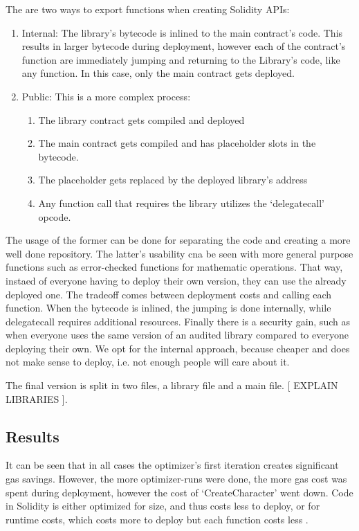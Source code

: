 The are two ways to export functions when creating Solidity APIs:
\begin{enumerate}
    \item Internal: The library's bytecode is inlined to the main contract's code. This results in larger bytecode during deployment, however each of the contract's function are immediately jumping and returning to the Library's code, like any function. In this case, only the main contract gets deployed.
    \item Public: This is a more complex process:
        \begin{enumerate}
            \item The library contract gets compiled and deployed
            \item The main contract gets compiled and has placeholder slots in the bytecode.
            \item The placeholder gets replaced by the deployed library's address
            \item Any function call that requires the library utilizes the `delegatecall' opcode.
        \end{enumerate}
\end{enumerate}

The usage of the former can be done for separating the code and creating a more well done repository. The latter's usability cna be seen with more general purpose functions such as error-checked functions for mathematic operations. That way, instaed of everyone having to deploy their own version, they can use the already deployed one. The tradeoff comes between deployment costs and calling each function. When the bytecode is inlined, the jumping is done internally, while delegatecall requires additional resources. Finally there is a security gain, such as when everyone uses the same version of an audited library compared to everyone deploying their own. We opt for the internal approach, because cheaper and does not make sense to deploy, i.e. not enough people will care about it.

The final version is split in two files, a library file and a main file. [ EXPLAIN LIBRARIES ]. 
% 

\subsection{Results}
It can be seen that in all cases the optimizer's first iteration creates significant gas savings. However, the more optimizer-runs were done, the more gas cost was spent during deployment, however the cost of `CreateCharacter' went down. Code in Solidity is either optimized for size, and thus costs less to deploy, or for runtime costs, which costs more to deploy but each function costs less \cite{optimizer-tradeoff}.

